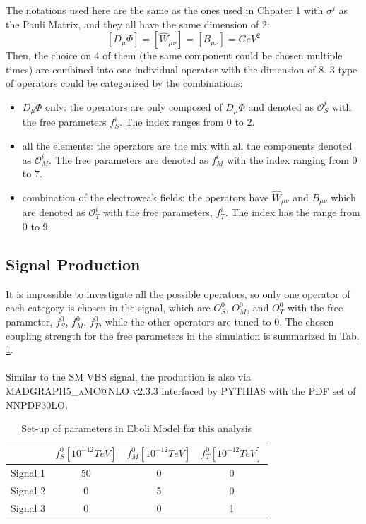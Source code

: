 The notations used here are the same as the ones used in Chpater 1 with $\sigma^j$ as the Pauli Matrix, and they all have the same dimension of 2:
\begin{equation}
\left[D_{\mu}\Phi\right]=\left[\hat{W}_{\mu\nu}\right]=\left[B_{\mu\nu}\right]= GeV^2
\end{equation}
Then, the choice on 4 of them (the same component could be chosen multiple times) are combined into one individual operator with the dimension of 8. 3 type of operators could be categorized by the combinations:
\begin{itemize}
    \item{$D_\mu\Phi$ only}: the operators are only composed of $D_\mu\Phi$ and denoted as $\mathcal{O}^i_S$ with the free parameters $f^i_{S}$. The index ranges from 0 to 2.  
    \item{all the elements}: the operators are the mix with all the components denoted as  $\mathcal{O}^i_M$. The free parameters are denoted as $f^i_{M}$ with the index ranging from 0 to 7.
    \item{combination of the electroweak fields}: the operators have $\hat{W}_{\mu\nu}$ and $B_{\mu\nu}$ which are denoted as $\mathcal{O}_{T}^i$ with the free parameters, $f_T^i$. The index has the range from 0 to 9. 
\end{itemize}
\noindent
\subsection{Signal Production}
It is impossible to investigate all the possible operators, so only one operator of each category is chosen in the signal, which are $O_{S}^0$, $O_{M}^0$, and $O_{T}^0$ with the free parameter, $f^0_{S}$, $f^0_{M}$,  $f_T^0$, while the other operators are tuned to 0.  The chosen coupling strength for the free parameters in the simulation is summarized in Tab. \ref{Tab:Eboli}.
\\
\\Similar to the SM VBS signal, the production is also via \textsc{MADGRAPH5\_aMC@NLO v2.3.3}\cite{Alwall:2014hca} interfaced by \textsc{PYTHIA8}\cite{Sjostrand:2007gs} with the PDF set of NNPDF30LO\cite{Ball:2012cx}. 
\begin{table}[h]
	\caption{Set-up of parameters in Eboli Model for this analysis} \label{Tab:Eboli}
	\begin{center}
		\begin{tabular}{ | c | c | c | c | }
		\hline
			     &   $f^0_{S}\left[10^{-12}TeV\right]$  & $f^0_{M}\left[10^{-12}TeV\right]$ & $f^0_{T}\left[10^{-12}TeV\right]$ \\
	    \hline
	    Signal 1 &        50                            & 0                                & 0 \\
	    \hline
		Signal 2 &        0                             & 5                                & 0 \\
		\hline
		Signal 3 &        0                             & 0                                & 1 \\
		\hline
		\end{tabular}
	\end{center}
\end{table}
\noindent
